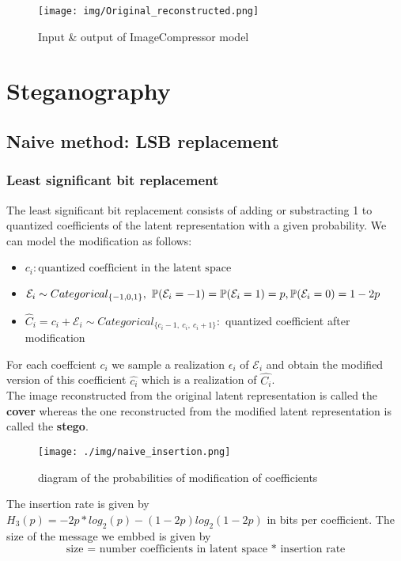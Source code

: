 \documentclass[12pt]{article}
\begin{document}
\begin{figure}[H]
    \centering
    \texttt{[image: img/Original\_reconstructed.png]}
    \caption[Image uncompressed \& AI compressed]{Input \& output of ImageCompressor model}
\end{figure}

\section{Steganography}
\subsection{Naive method: LSB replacement}
\subsubsection{Least significant bit replacement}
The least significant bit replacement consists of adding or substracting 1 to quantized coefficients of the latent representation with a given probability. We can model the modification as follows:

\begin{itemize}
    \item $c_i: \text{quantized coefficient in the latent space}$
    \item $\mathcal{E}
    _i \sim Categorical_{\{-1,0,1\}},\\
    \ \mathbb{P}(\mathcal{E}_i = -1) = \mathbb{P}(\mathcal{E}_i = 1) = p,\\
    \mathbb{P}(\mathcal{E}_i = 0) = 1-2p$ 
    \item $\hat{C}_i = c_i + \mathcal{E}_i \sim Categorical_{\{c_i-1,\ c_i,\ c_i+1\}}:$ quantized coefficient after modification
\end{itemize}

For each coeffcient $c_i$ we sample a realization $\epsilon_i$ of $\mathcal{E}_i$ and obtain the modified version of this coefficient $\hat{c_i}$ which is a realization of $\hat{C_i}$.\\
The image reconstructed from the original latent representation is called the \textbf{cover} whereas the one reconstructed from the modified latent representation is called the \textbf{stego}.

\begin{figure}[H]
    \centering
    \texttt{[image: ./img/naive\_insertion.png]}
    \caption[Diagram of the probabilities of modification of coefficients]{diagram of the probabilities of modification of coefficients}
    \label{fig:probabilities}
\end{figure}
The insertion rate is given by $H_3(p) = -2p*log_2(p) - (1-2p)log_2(1-2p)$ in bits per coefficient. The size of the message we embbed is given by \[\text{size = number coefficients in latent space * insertion rate}\]
\end{document}
